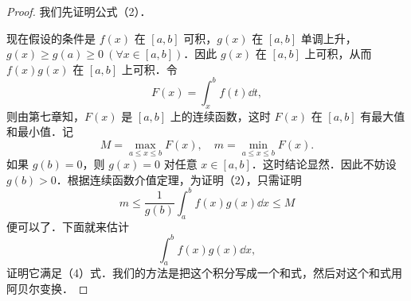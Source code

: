 \begin{proof}
我们先证明公式（2）．

现在假设的条件是 $f(x)$ 在 $[a,b]$ 可积，$g(x)$ 在 $[a,b]$ 单调上升，$g(x)\geqslant g(a)\geqslant 0\ (\forall x\in[a,b])$．因此 $g(x)$ 在 $[a,b]$ 上可积，从而 $f(x)g(x)$ 在 $[a,b]$ 上可积．令
\[
F(x)=\int_{x}^{b}f(t)\dd t,
\]
则由第七章知，$F(x)$ 是 $[a,b]$ 上的连续函数，这时 $F(x)$ 在 $[a,b]$ 有最大值和最小值．记
\[
M=\max_{a\leqslant x\leqslant b}F(x),\quad m=\min_{a\leqslant x\leqslant b}F(x).
\]
如果 $g(b)=0$，则 $g(x)=0$ 对任意 $x\in[a,b]$．这时结论显然．因此不妨设 $g(b)>0$．根据连续函数介值定理，为证明（2），只需证明
\begin{equation}
m\leqslant\frac{1}{g(b)}\int_{a}^{b}f(x)g(x)\dd x\leqslant M
\tag{4}
\end{equation}
便可以了．下面就来估计
\[
\int_{a}^{b}f(x)g(x)\dd x,
\]
证明它满足（4）式．我们的方法是把这个积分写成一个和式，然后对这个和式用阿贝尔变换．


\end{proof}
